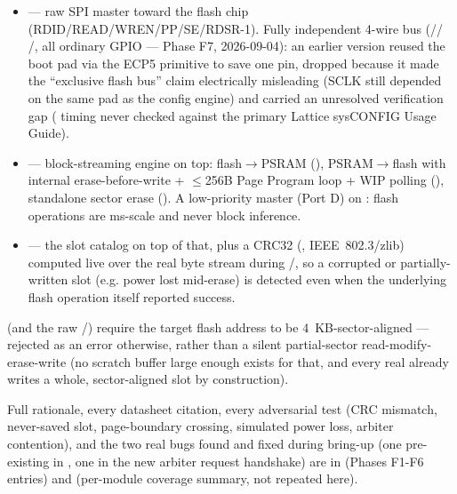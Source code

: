 \begin{fnnote}
\begin{itemize}
\item {} --- raw SPI master toward the flash chip
      (RDID/READ/WREN/PP/SE/RDSR-1). Fully independent 4-wire bus (//
      /, all ordinary GPIO --- Phase F7, 2026-09-04): an earlier
      version reused the boot  pad via the ECP5  primitive to save
      one pin, dropped because it made the ``exclusive flash bus'' claim electrically
      misleading (SCLK still depended on the same pad as the config engine) and carried an
      unresolved verification gap ( timing never checked against the
      primary Lattice sysCONFIG Usage Guide).
\item {} --- block-streaming engine on top: flash$\to$PSRAM
      (), PSRAM$\to$flash with internal erase-before-write + $\leq$256B
      Page Program loop + WIP polling (), standalone sector erase
      (). A low-priority master (Port D) on :
      flash operations are ms-scale and never block inference.
\item {} --- the slot catalog on top of that, plus a CRC32
      (, IEEE~802.3/zlib) computed live over the real byte stream during
      /, so a corrupted or partially-written slot (e.g. power
      lost mid-erase) is detected even when the underlying flash operation itself reported
      success.
\end{itemize}
\end{fnnote}

\begin{fnwarn}
 (and the raw /) require the target
flash address to be 4~KB-sector-aligned --- rejected as an error otherwise, rather than a
silent partial-sector read-modify-erase-write (no scratch buffer large enough exists for
that, and every real  already writes a whole, sector-aligned slot by
construction).
\end{fnwarn}

Full rationale, every datasheet citation, every adversarial test (CRC mismatch, never-saved
slot, page-boundary crossing, simulated power loss, arbiter contention), and the two real
bugs found and fixed during bring-up (one pre-existing in , one in
the new arbiter request handshake) are in  (Phases F1-F6 entries) and
 (per-module coverage summary, not
repeated here).

